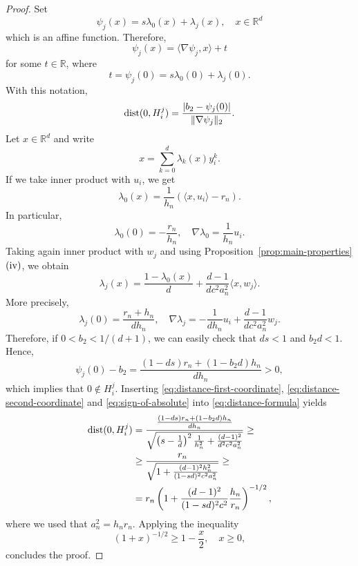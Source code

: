 \documentclass[10pt]{amsart}
\newcommand{\1}{\textbf{1}}
\newcommand{\dist}{{\rm dist}}
\numberwithin{equation}{section} %
\theoremstyle{remark}
\theoremstyle{definition}
\begin{document}
\begin{proof}
    Set \[\psi_j(x)=s\lambda_0(x)+\lambda_j(x), \quad x \in \mathbb{R}^d\] which is an affine function. Therefore, \[\psi_j(x)=\langle\nabla\psi_j,x \rangle+t\] for some $t \in \mathbb{R}$, where \[t=\psi_j(0)=s\lambda_0(0)+\lambda_j(0).\] With this notation, \begin{equation}\label{eq:distance-formula}\dist(0, H_i^j)=\frac{|b_2-\psi_j(0)|}{\|\nabla \psi_j\|_2}.
    \end{equation}
    Let $x \in \mathbb{R}^d$ and write \[x=\sum_{k=0}^d \lambda_k(x) y_i^k.\] If we take inner product with $u_i$, we get \[\lambda_0(x)=\frac{1}{h_n}(\langle x, u_i \rangle-r_n).
    \] In particular, \begin{equation}\label{eq:distance-first-coordinate}
    \lambda_0(0)=-\frac{r_n}{h_n}, \quad \nabla\lambda_0=\frac{1}{h_n}u_i.
    \end{equation} Taking again inner product with $w_j$ and using Proposition~\ref{prop:main-properties} ${\rm (iv)}$, we obtain \[\lambda_j(x)=\frac{1-\lambda_0(x)}{d}+\frac{d-1}{dc^2a_n^2}\langle x, w_j\rangle.\] More precisely, \begin{equation}\label{eq:distance-second-coordinate}
    \lambda_j(0)=\frac{r_n+h_n}{dh_n},\quad \nabla\lambda_j=-\frac{1}{dh_n}u_i+\frac{d-1}{dc^2a_n^2}w_j.
    \end{equation} Therefore, if $0<b_2<1/(d+1)$, we can easily check that $ds<1$ and $b_2d<1$. Hence, \begin{equation}\label{eq:sign-of-absolute}
        \psi_j(0)-b_2=\frac{(1-ds)r_n+(1-b_2d)h_n}{dh_n}>0,
    \end{equation} which implies that  $0\notin H_i^j$. Inserting \eqref{eq:distance-first-coordinate}, \eqref{eq:distance-second-coordinate} and \eqref{eq:sign-of-absolute} into \eqref{eq:distance-formula} yields \begin{align*}\dist(0, H_i^j)&=\frac{\frac{(1-ds)r_n+(1-b_2d)h_n}{dh_n}}{\sqrt{\left(s-\frac{1}{d}\right)^2 \frac{1}{h_n^2}+\frac{(d-1)^2}{d^2c^2a_n^2}}} \geq \\
    &\geq \frac{r_n}{\sqrt{1+\frac{(d-1)^2h_n^2}{(1-sd)^2c^2a_n^2}}}\geq\\
    & = r_n \left(1+\frac{(d-1)^2}{(1-sd)^2c^2}\frac{h_n}{r_n}\right)^{-1/2},
    \end{align*} where we used that $a_n^2=h_nr_n$. Applying the inequality \[(1+x)^{-1/2} \geq 1-\frac{x}{2}, \quad x \geq 0,\] concludes the proof.
\end{proof}
\end{document}

